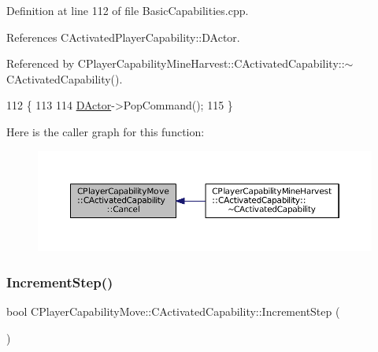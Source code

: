 Definition at line 112 of file Basic\+Capabilities.\+cpp.



References C\+Activated\+Player\+Capability\+::\+D\+Actor.



Referenced by C\+Player\+Capability\+Mine\+Harvest\+::\+C\+Activated\+Capability\+::$\sim$\+C\+Activated\+Capability().


\begin{DoxyCode}
112                                                       \{
113 
114     \hyperlink{classCActivatedPlayerCapability_a54ca944b47bff2718330639941d402b0}{DActor}->PopCommand();
115 \}
\end{DoxyCode}
Here is the caller graph for this function\+:\nopagebreak
\begin{figure}[H]
\begin{center}
\leavevmode
\includegraphics[width=350pt]{classCPlayerCapabilityMove_1_1CActivatedCapability_a6fe1e26646bd14e94ebf7abd0a41cdd3_icgraph}
\end{center}
\end{figure}
\hypertarget{classCPlayerCapabilityMove_1_1CActivatedCapability_af4670890b462f59d24195db14aeb436d}{}\label{classCPlayerCapabilityMove_1_1CActivatedCapability_af4670890b462f59d24195db14aeb436d} 
\subsubsection{\texorpdfstring{Increment\+Step()}{IncrementStep()}}
{\footnotesize\ttfamily bool C\+Player\+Capability\+Move\+::\+C\+Activated\+Capability\+::\+Increment\+Step (\begin{DoxyParamCaption}{ }\end{DoxyParamCaption})\hspace{0.3cm}{\ttfamily [virtual]}}



